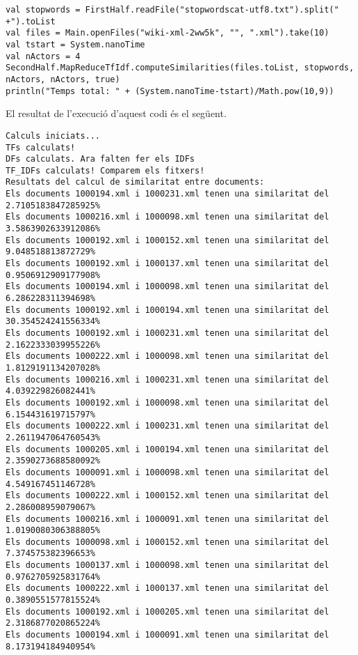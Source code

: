 \documentclass{report}
\begin{document}
\begin{lstlisting}[style=scalaHighlight]
val stopwords = FirstHalf.readFile("stopwordscat-utf8.txt").split(" +").toList
val files = Main.openFiles("wiki-xml-2ww5k", "", ".xml").take(10)
val tstart = System.nanoTime
val nActors = 4
SecondHalf.MapReduceTfIdf.computeSimilarities(files.toList, stopwords, nActors, nActors, true)
println("Temps total: " + (System.nanoTime-tstart)/Math.pow(10,9))
\end{lstlisting}

\newpage

El resultat de l'execució d'aquest codi és el següent.

\begin{verbatim}
Calculs iniciats...
TFs calculats!
DFs calculats. Ara falten fer els IDFs
TF_IDFs calculats! Comparem els fitxers!
Resultats del calcul de similaritat entre documents:
Els documents 1000194.xml i 1000231.xml tenen una similaritat del 2.7105183847285925%
Els documents 1000216.xml i 1000098.xml tenen una similaritat del 3.5863902633912086%
Els documents 1000192.xml i 1000152.xml tenen una similaritat del 9.048518813872729%
Els documents 1000192.xml i 1000137.xml tenen una similaritat del 0.9506912909177908%
Els documents 1000194.xml i 1000098.xml tenen una similaritat del 6.286228311394698%
Els documents 1000192.xml i 1000194.xml tenen una similaritat del 30.354524241556334%
Els documents 1000192.xml i 1000231.xml tenen una similaritat del 2.1622333039955226%
Els documents 1000222.xml i 1000098.xml tenen una similaritat del 1.8129191134207028%
Els documents 1000216.xml i 1000231.xml tenen una similaritat del 4.039229826082441%
Els documents 1000192.xml i 1000098.xml tenen una similaritat del 6.154431619715797%
Els documents 1000222.xml i 1000231.xml tenen una similaritat del 2.2611947064760543%
Els documents 1000205.xml i 1000194.xml tenen una similaritat del 2.3590273688580092%
Els documents 1000091.xml i 1000098.xml tenen una similaritat del 4.549167451146728%
Els documents 1000222.xml i 1000152.xml tenen una similaritat del 2.286008959079067%
Els documents 1000216.xml i 1000091.xml tenen una similaritat del 1.0190080306388805%
Els documents 1000098.xml i 1000152.xml tenen una similaritat del 7.374575382396653%
Els documents 1000137.xml i 1000098.xml tenen una similaritat del 0.9762705925831764%
Els documents 1000222.xml i 1000137.xml tenen una similaritat del 0.3890551577815524%
Els documents 1000192.xml i 1000205.xml tenen una similaritat del 2.3186877020865224%
Els documents 1000194.xml i 1000091.xml tenen una similaritat del 8.173194184940954%

\end{verbatim}
\end{document}
